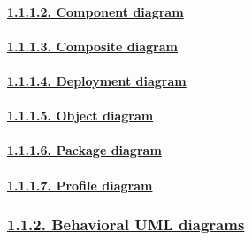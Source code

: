 \documentclass[
]{article}
\begin{document}
\hypertarget{component-diagram}{%
\paragraph{\texorpdfstring{\protect\hyperlink{component-diagram-1}{1.1.1.2.
Component
diagram}}{1.1.1.2. Component diagram}}\label{component-diagram}}

\hypertarget{composite-diagram}{%
\paragraph{\texorpdfstring{\protect\hyperlink{composite-diagram-1}{1.1.1.3.
Composite
diagram}}{1.1.1.3. Composite diagram}}\label{composite-diagram}}

\hypertarget{deployment-diagram}{%
\paragraph{\texorpdfstring{\protect\hyperlink{deployment-diagram-1}{1.1.1.4.
Deployment
diagram}}{1.1.1.4. Deployment diagram}}\label{deployment-diagram}}

\hypertarget{object-diagram}{%
\paragraph{\texorpdfstring{\protect\hyperlink{object-diagram-1}{1.1.1.5.
Object diagram}}{1.1.1.5. Object diagram}}\label{object-diagram}}

\hypertarget{package-diagram}{%
\paragraph{\texorpdfstring{\protect\hyperlink{package-diagram-1}{1.1.1.6.
Package diagram}}{1.1.1.6. Package diagram}}\label{package-diagram}}

\hypertarget{profile-diagram}{%
\paragraph{\texorpdfstring{\protect\hyperlink{profile-diagram-1}{1.1.1.7.
Profile diagram}}{1.1.1.7. Profile diagram}}\label{profile-diagram}}

\hypertarget{behavioral-uml-diagrams}{%
\subsubsection{\texorpdfstring{\protect\hyperlink{behavioral-uml-diagrams-1}{1.1.2.
Behavioral UML
diagrams}}{1.1.2. Behavioral UML diagrams}}\label{behavioral-uml-diagrams}}
\end{document}
